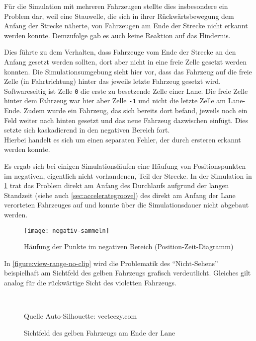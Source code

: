 Für die Simulation mit mehreren Fahrzeugen stellte dies insbesondere ein Problem dar, weil eine Stauwelle, die sich in ihrer Rückwärtsbewegung dem Anfang der Strecke näherte, von Fahrzeugen am Ende der Strecke nicht erkannt werden konnte.
Demzufolge gab es auch keine Reaktion auf das Hindernis.

Dies führte zu dem Verhalten, dass Fahrzeuge vom Ende der Strecke an den Anfang gesetzt werden sollten, dort aber nicht in eine freie Zelle gesetzt werden konnten.
Die Simulationsumgebung sieht hier vor, dass das Fahrzeug auf die freie Zelle (in Fahrtrichtung) hinter das jeweils letzte Fahrzeug gesetzt wird.
\\
Softwareseitig ist Zelle \texttt{0} die erste zu besetzende Zelle einer Lane. Die freie Zelle hinter dem Fahrzeug war hier aber Zelle \texttt{-1} und nicht die letzte Zelle am Lane-Ende.
Zudem wurde ein Fahrzeug, das sich bereits dort befand, jeweils noch ein Feld weiter nach hinten gesetzt und das neue Fahrzeug dazwischen einfügt.
Dies setzte sich kaskadierend in den negativen Bereich fort.
\\
Hierbei handelt es sich um einen separaten Fehler, der durch ersteren erkannt werden konnte.

Es ergab sich bei einigen Simulationsläufen eine Häufung von Positionspunkten im negativen, eigentlich nicht vorhandenen, Teil der Strecke.
In der Simulation in \cref{figure:negativ-sammeln} trat das Problem direkt am Anfang des Durchlaufs aufgrund der langen Standzeit (siehe auch \cref{sec:accelerategroove}) des direkt am Anfang der Lane verorteten Fahrzeuges auf und konnte über die Simulationsdauer nicht abgebaut werden.
\begin{figure}[hptb]
 \centering
 \texttt{[image: negativ-sammeln]}
 \caption[Punktehäufung im negativen Bereich]
 		 {Häufung der Punkte im negativen Bereich (Position-Zeit-Diagramm)}
 \label{figure:negativ-sammeln}
\end{figure} 

In \cref{figure:view-range-no-clip} wird die Problematik des \enquote{Nicht-Sehens} beispielhaft am Sichtfeld des gelben Fahrzeugs grafisch verdeutlicht. 
Gleiches gilt analog für die rückwärtige Sicht des violetten Fahrzeugs.

\begin{figure}[hptb]
  \centering
     \\
  \caption[Umbrechen des Sichtfelds eines Fahrzeugs am Ende der Lane]
          {Sichtfeld des gelben Fahrzeugs am Ende der Lane}
          {\footnotesize Quelle Auto-Silhouette: vecteezy.com}
  \label{figure:view-range-no-clip-clip}
\end{figure}

